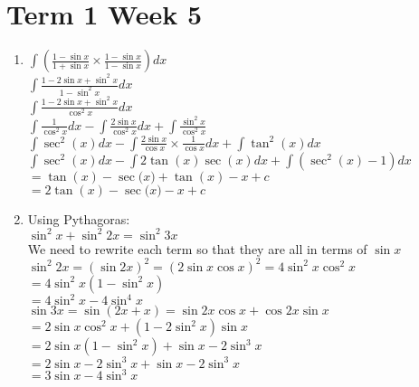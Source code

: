 \documentclass[../main.tex]{subfiles}
\begin{document}
\section*{Term 1 Week 5}
\begin{enumerate}
    \item 
    \(\int (\frac{1-\sin{x}}{1+\sin{x}} \times \frac{1-\sin{x}}{1-\sin{x}}) dx\)\\

    \(\int \frac{1-2\sin{x}+\sin^2{x}}{1-\sin^2{x}} dx\)\\

    \(\int \frac{1-2\sin{x}+\sin^2{x}}{\cos^2{x}} dx\)\\

    \(\int \frac{1}{\cos^2{x}} dx-\int \frac{2\sin{x}}{\cos^2{x}}dx + \int \frac{\sin^2{x}}{\cos^2{x}} \)\\

    \(\int \sec^2{(x)}dx - \int \frac{2\sin{x}}{\cos{x}}\times \frac{1}{\cos{x}} dx + \int \tan^2{(x)}dx\)\\

    \(\int \sec^2{(x)}dx - \int 2\tan{(x)}\sec{(x)} dx + \int (\sec^2{(x)}-1) dx\)\\

    \(=\tan{(x)}-\sec{(x})+\tan{(x)}-x+c\)\\

    \(=2\tan{(x)}-\sec{(x})-x+c\)\\
    
    \item 
    Using Pythagoras:\\
    \(\sin^2{x}+\sin^2{2x}=\sin^2{3x}\)\\

    We need to rewrite each term so that they are all in terms of \(\sin{x}\)\\
    \(\sin^2{2x}=(\sin{2x})^2=(2\sin{x}\cos{x})^2=4\sin^2{x}\cos^2{x}\)\\
    \(=4\sin^2{x}(1-\sin^2{x})\)\\
    \(=4\sin^2{x}-4\sin^4{x}\)\\

    \(\sin{3x}=\sin{(2x+x)}=\sin{2x}\cos{x}+\cos{2x}\sin{x}\)\\
    \(=2\sin{x}\cos^2{x}+(1-2\sin^2{x})\sin{x}\)\\
    \(=2\sin{x}(1-\sin^2{x})+\sin{x}-2\sin^3{x}\)\\
    \(=2\sin{x}-2\sin^3{x}+\sin{x}-2\sin^3{x}\)\\
    \(=3\sin{x}-4\sin^3{x}\)\\
    

\end{enumerate}
\end{document}
